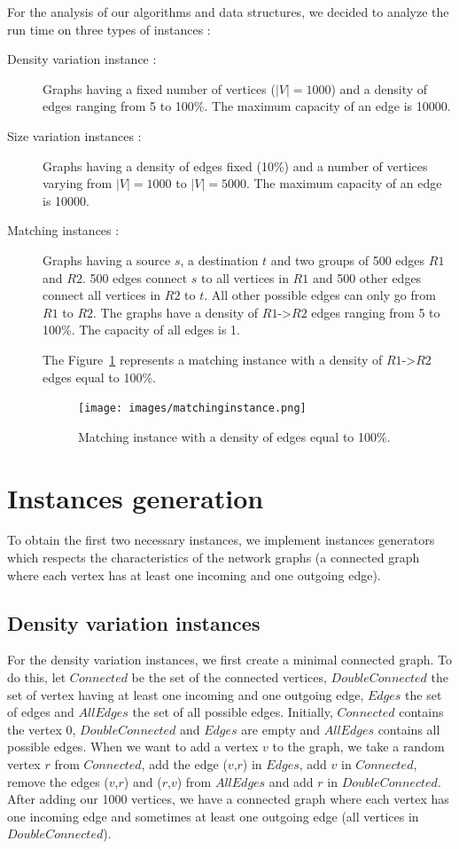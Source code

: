 
For the analysis of our algorithms and data structures, we decided to analyze the run time on three types of instances :
\begin{description}
\item[Density variation instance :]{Graphs having a fixed number of vertices ($|V|=1000$) and a density of edges ranging from 5 to 100\%. The maximum capacity of an edge is 10000.}
\item[Size variation instances :]{Graphs having a density of edges fixed (10\%) and a number of vertices varying from $|V|=1000$ to $|V|=5000$. The maximum capacity of an edge is 10000.}
\item[Matching instances :]{Graphs having a source $s$, a destination $t$ and two groups of 500 edges $R1$ and $R2$. 500 edges connect $s$ to all vertices in $R1$ and 500 other edges connect all vertices in $R2$ to $t$. All other possible edges can only go from $R1$ to $R2$. The graphs have a density of $R1$->$R2$ edges ranging from 5 to 100\%. The capacity of all edges is 1.

The Figure~\ref{fig:matching} represents a matching instance with a density of $R1$->$R2$ edges equal to 100\%.

\begin{figure}[H]
\begin{center}
\texttt{[image: images/matchinginstance.png]}
\caption{Matching instance with a density of edges equal to 100\%.}
\label{fig:matching}
\end{center}
\end{figure}}
\end{description} 

\section{Instances generation}
To obtain the first two necessary instances, we implement instances generators which respects the characteristics of the network graphs (a connected graph where each vertex has at least one incoming and one outgoing edge).

\subsection{Density variation instances}
For the density variation instances, we first create a minimal connected graph. To do this, let $Connected$ be the set of the connected vertices, $DoubleConnected$ the set of vertex having at least one incoming and one outgoing edge, $Edges$ the set of edges and $AllEdges$ the set of all possible edges. Initially, $Connected$ contains the vertex 0, $DoubleConnected$ and $Edges$ are empty and $AllEdges$ contains all possible edges. When we want to add a vertex $v$ to the graph, we take a random vertex $r$ from $Connected$, add the edge ($v$,$r$) in $Edges$, add $v$ in $Connected$, remove the edges ($v$,$r$) and ($r$,$v$) from $AllEdges$ and add $r$ in $DoubleConnected$. After adding our 1000 vertices, we have a connected graph where each vertex has one incoming edge and sometimes at least one outgoing edge (all vertices in $DoubleConnected$).


